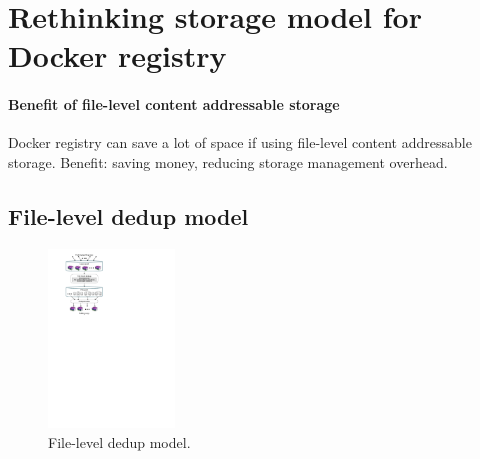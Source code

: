 \section{Rethinking storage model for Docker registry}
\label{sec:file_adressable}

\paragraph{Benefit of file-level content addressable storage}
Docker registry can save a lot of space if using file-level content addressable storage. 
Benefit: saving money, reducing storage management overhead.

\subsection{File-level dedup model}

\begin{figure}
	\centering
	\includegraphics[width=0.3\textwidth]{graphs/graph_compression_layers.pdf}
	\caption{File-level dedup model.
	}
	\label{fig:file-dedup-model}
\end{figure}



